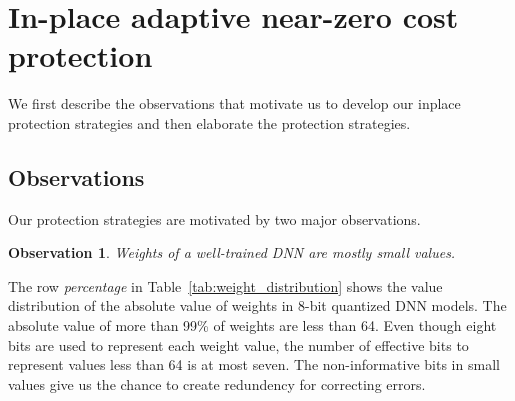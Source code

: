 \documentclass{article}
\newtheorem{observation}{Observation}
\begin{document}

\section{In-place adaptive near-zero cost protection}
We first describe the observations that motivate us to develop our inplace protection strategies and then elaborate the protection strategies. 

\subsection{Observations}
Our protection strategies are motivated by two major observations.      

\begin{observation}
Weights of a well-trained DNN are mostly small values.
\end{observation}

The row \textit{percentage} in Table~\ref{tab:weight_distribution} shows the value distribution of the absolute value of weights in 8-bit quantized DNN models. The absolute value of more than 99\% of weights are less than 64. Even though eight bits are used to represent each weight value, the number of effective bits to represent values less than 64 is at most seven. The non-informative bits in small values give us the chance to create redundency for correcting errors. 
\end{document}
